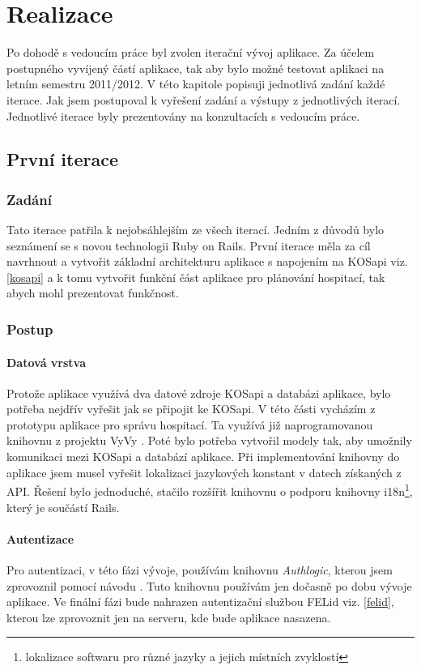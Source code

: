 \chapter{Realizace}
Po dohodě s vedoucím práce byl zvolen iterační vývoj aplikace. Za účelem postupného vyvíjený částí aplikace, tak aby bylo možné testovat aplikaci na letním semestru 2011/2012. V této kapitole popisuji jednotlivá zadání každé iterace. Jak jsem postupoval k vyřešení zadání a výstupy z jednotlivých iterací. Jednotlivé iterace byly prezentovány na konzultacích s vedoucím práce.

\section{První iterace}
\subsection{Zadání}
Tato iterace patřila k nejobsáhlejším ze všech iterací. Jedním z důvodů bylo  seznámení se s novou technologii Ruby on Rails. První iterace měla za cíl navrhnout a vytvořit základní architekturu aplikace s napojením na KOSapi viz. \ref{kosapi} a k tomu vytvořit funkční část aplikace pro plánování hospitací, tak abych mohl prezentovat funkčnost.

\subsection{Postup}
\subsubsection{Datová vrstva}
Protože aplikace využívá dva datové zdroje KOSapi  a databázi aplikace, bylo potřeba nejdřív vyřešit jak se připojit ke KOSapi. V této části vycházím z prototypu aplikace pro správu hospitací. Ta využívá již naprogramovanou knihovnu z projektu VyVy \cite{vyvy}. Poté bylo potřeba vytvořil modely tak, aby umožnily komunikaci mezi KOSapi a databází aplikace. Při implementování knihovny do aplikace jsem musel vyřešit lokalizaci jazykových konstant v datech získaných z API. Řešení bylo jednoduché, stačilo rozšířit knihovnu o podporu knihovny i18n\footnote{lokalizace softwaru pro různé jazyky a jejich místních zvyklostí}, který je součástí Rails.

\subsubsection{Autentizace}
Pro autentizaci, v této fázi vývoje, používám knihovnu \textit{Authlogic}, kterou jsem zprovoznil pomocí návodu \cite{authlogic}. Tuto knihovnu používám jen dočasně po dobu vývoje aplikace. Ve finální fázi bude nahrazen autentizační službou FELid viz. \ref{felid}, kterou lze zprovoznit jen na serveru, kde bude aplikace nasazena. 


